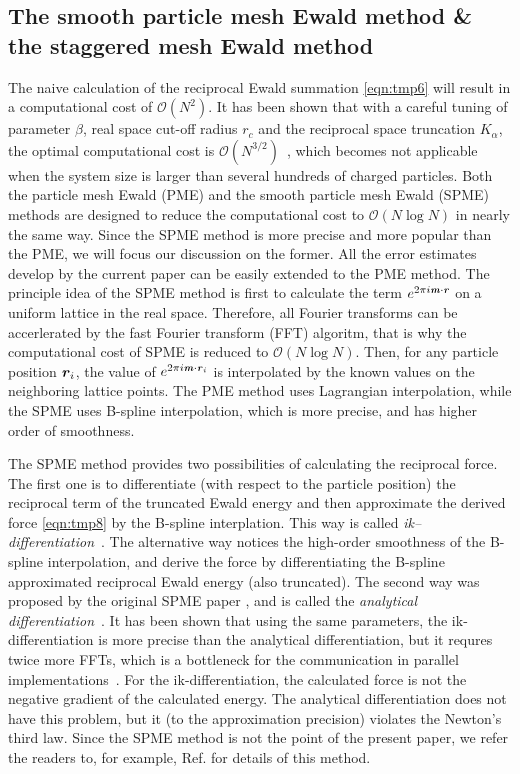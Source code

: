 \documentclass[aps,pre,preprint]{revtex4}
\renewcommand{\v}[1]{\textbf{\textit{#1}}}
\begin{document}
\subsection{The smooth particle mesh Ewald method \&
the staggered mesh Ewald method}

The naive calculation of the reciprocal Ewald summation
\eqref{eqn:tmp6} will result in a computational cost of $\mathcal
O(N^2)$. It has been shown that with a careful tuning of parameter
$\beta$, real space cut-off radius $r_c$
and the reciprocal space truncation $K_\alpha$, the
optimal computational cost is $\mathcal O(N^{3/2})$~\cite{perram1988asc},
which becomes not applicable when the system
size is larger than several hundreds of charged particles. Both the
particle mesh Ewald (PME) \cite{darden1993pme} and the smooth particle
mesh Ewald (SPME) \cite{essmann1995spm} methods are designed to reduce
the computational cost to $\mathcal O(N\log N)$ in nearly the same
way.  Since the SPME method is more precise \cite{deserno1998mue1} and
more popular than the PME, we will focus our discussion on the
former. All the error estimates develop by the current paper can be
easily extended to the PME method.  The principle idea of the SPME method
is first to calculate the term $e^{2\pi i\v m\cdot\v r}$ on a uniform
lattice in the real space.  Therefore, all Fourier transforms can be
accerlerated by the fast Fourier transform (FFT) algoritm, that is why the
computational cost of SPME is reduced to $\mathcal O(N\log N)$. Then,
for any particle position $\v r_i$, the value of $e^{2\pi i\v m\cdot\v
  r_i}$ is interpolated by the known values on the neighboring lattice
points.  The PME method uses Lagrangian interpolation, while the SPME
uses B-spline interpolation,  which is more precise, and has higher order
of smoothness.

The SPME method provides two possibilities of calculating the
reciprocal force. The first one is to differentiate (with respect to
the particle position) the reciprocal term of the truncated Ewald
energy and then approximate the derived force \eqref{eqn:tmp8} by the
B-spline interplation. This way is called
\emph{ik--differentiation}~\cite{deserno1998mue1}.
The alternative way notices the high-order
smoothness of the B-spline interpolation, and derive the force by
differentiating the B-spline approximated reciprocal Ewald energy
(also truncated). The second way was proposed by the original SPME paper
\cite{essmann1995spm}, and is called the \emph{analytical
  differentiation}~\cite{deserno1998mue1}.
It has been shown that using the same parameters,
the ik-differentiation is more precise than the analytical
differentiation, but it requres twice more FFTs, which is a bottleneck
for the communication in parallel
implementations~\cite{wang2010optimizing}.
For the ik-differentiation, the calculated force is not the negative
gradient of the calculated energy. The analytical differentiation
does not have this problem, but it (to the approximation precision)
violates the Newton's third law.
Since the SPME method is
not the point of the present paper, we refer the readers to, for
example, Ref. \cite{essmann1995spm, deserno1998mue1,
  wang2010optimizing} for details of this method.
\end{document}
